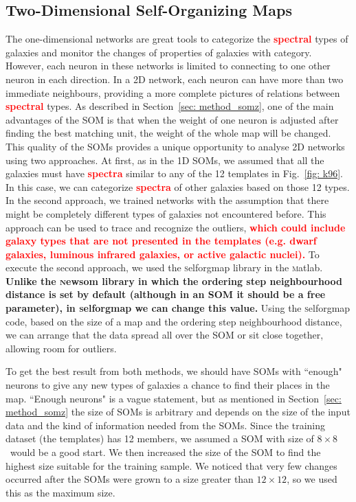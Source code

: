     \subsection{Two-Dimensional Self-Organizing Maps}
    \label{sec: 2D}
    The one-dimensional networks are great tools to categorize the \textbf{\textcolor{red}{spectral}} types of galaxies and monitor the changes of properties of galaxies with category.
    However, each neuron in these networks is limited to connecting to one other neuron in each direction.
    In a 2D network, each neuron can have more than two immediate neighbours, providing a more complete pictures of relations between \textbf{\textcolor{red}{spectral}} types.
    As described in Section~\ref{sec: method_somz}, one of the main advantages of the SOM is that when the weight of one neuron is adjusted after finding the best matching unit, the weight of the whole map will be changed.
    This quality of the SOMs provides a unique opportunity to analyse 2D networks using two approaches. 
    At first, as in the 1D SOMs, we assumed that all the galaxies must have \textbf{\textcolor{red}{spectra}} similar to any of the 12 templates in Fig.~\ref{fig: k96}.
    In this case, we can categorize \textbf{\textcolor{red}{spectra}} of other galaxies based on those 12 types.
    In the second approach, we trained networks with the assumption that there might be completely different types of galaxies not encountered before.
    This approach can be used to trace and recognize the outliers, \textbf{\textcolor{red}{which could include galaxy types that are not presented in the  templates (e.g. dwarf galaxies, luminous infrared galaxies, or active galactic nuclei).}}
    To execute the second approach, we used the {\textsc selforgmap} library in the {\textsc matlab}.
    \textbf{Unlike the {\textsc newsom} library in which the ordering step neighbourhood distance is set by default (although in an SOM it should be a free parameter), in {\textsc selforgmap} we can change this value.}
    Using the {\textsc selforgmap} code, based on the size of a map and the ordering step neighbourhood distance, we can arrange that the data spread all over the SOM or sit close together, allowing room for outliers.

    To get the best result from both methods, we should have SOMs with ``enough"  neurons to give any new types of galaxies a chance to find their places in the map.
    ``Enough neurons" is a vague statement, but as mentioned in Section~\ref{sec: method_somz} the size of SOMs is arbitrary and depends on the size of the input data and the kind of information needed from the SOMs.
    Since the training dataset (the  templates) has 12 members, we assumed a SOM with size of $8\times8$~would be a good start.
    We then increased the size of the SOM to find the highest size suitable for the training sample.
    We noticed that very few changes occurred after the SOMs were grown to a size greater than $12\times12$, so we used this as the maximum size.
    
